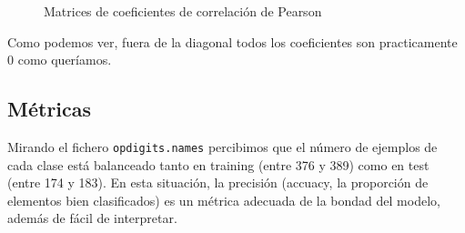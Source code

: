 \documentclass[a4]{article}
\begin{document}
\vspace{-4mm}
\begin{figure}[H]
  \centering
  \caption{Matrices de coeficientes de correlación de Pearson}
  \label{fig:pearson}
\end{figure}
\vspace{-4mm}

Como podemos ver, fuera de la diagonal todos los coeficientes son
practicamente 0 como queríamos.

\subsection{Métricas}

Mirando el fichero \texttt{opdigits.names} percibimos que el número de
ejemplos de cada clase está balanceado tanto en training (entre 376 y
389) como en test (entre 174 y 183). En esta situación, la precisión
(accuacy, la proporción de elementos bien clasificados) es un métrica
adecuada de la bondad del modelo, además de fácil de interpretar.
\end{document}
